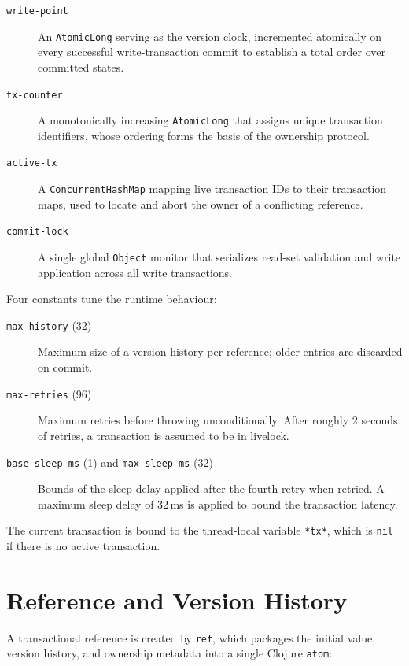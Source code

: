 \begin{description}
  \item[\texttt{write-point}] An \texttt{AtomicLong} serving as the version
        clock, incremented atomically on every successful write-transaction
        commit to establish a total order over committed states.
  \item[\texttt{tx-counter}] A monotonically increasing \texttt{AtomicLong}
        that assigns unique transaction identifiers, whose ordering forms the
        basis of the ownership protocol.
  \item[\texttt{active-tx}] A \texttt{ConcurrentHashMap} mapping live
        transaction IDs to their transaction maps, used to locate and abort
        the owner of a conflicting reference.
  \item[\texttt{commit-lock}] A single global \texttt{Object} monitor that
        serializes read-set validation and write application across all write
        transactions.
\end{description}

Four constants tune the runtime behaviour:

\begin{description}
  \item[\texttt{max-history} (32)] Maximum size of a version history per
        reference; older entries are discarded on commit.
  \item[\texttt{max-retries} (96)] Maximum retries before throwing
        unconditionally. After roughly 2 seconds of retries, a transaction
        is assumed to be in livelock.
  \item[\texttt{base-sleep-ms} (1) and \texttt{max-sleep-ms} (32)] Bounds
        of the sleep delay applied after the fourth retry when retried.
        A maximum sleep delay of 32\,ms is applied to bound the transaction
        latency.
\end{description}

The current transaction is bound to the thread-local variable \texttt{*tx*},
which is \texttt{nil} if there is no active transaction.

\section{Reference and Version History}

A transactional reference is created by \texttt{ref}, which packages the
initial value, version history, and ownership metadata into a single Clojure
\texttt{atom}:

